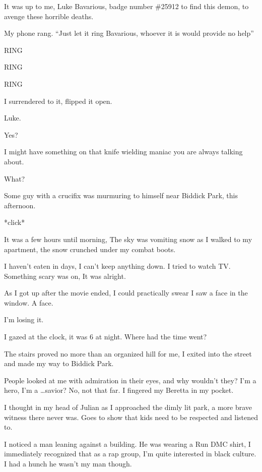 It was up to me, Luke Bavarious, badge number \#25912 to find this
demon, to avenge these horrible deaths.



My phone rang. ``Just let it ring Bavarious, whoever it is would
provide no help''

RING

RING

RING

I surrendered to it, flipped it open.



Luke.

Yes?

I might have something on that knife wielding maniac you are always
talking about.

What?

Some guy with a crucifix was murmuring to himself near Biddick
Park, this afternoon.

*click*



It was a few hours until morning, The sky was vomiting snow as I
walked to my apartment, the snow crunched under my combat
boots.



I haven't eaten in days, I can't keep anything down. I tried to
watch TV. Something scary was on, It was alright.

As I got up after the movie ended, I could practically swear I saw
a face in the window. A face.



I'm losing it.



I gazed at the clock, it was 6 at night. Where had the time
went?



The stairs proved no more than an organized hill for me, I exited
into the street and made my way to Biddick Park.



People looked at me with admiration in their eyes, and why wouldn't
they? I'm a hero, I'm a {\ldots}savior? No, not that far. I fingered my
Beretta in my pocket.



I thought in my head of Julian as I approached the dimly lit park,
a more brave witness there never was. Goes to show that kids need
to be respected and listened to.



I noticed a man leaning against a building. He was wearing a Run
DMC shirt, I immediately recognized that as a rap group, I'm quite
interested in black culture. I had a hunch he wasn't my man
though.



